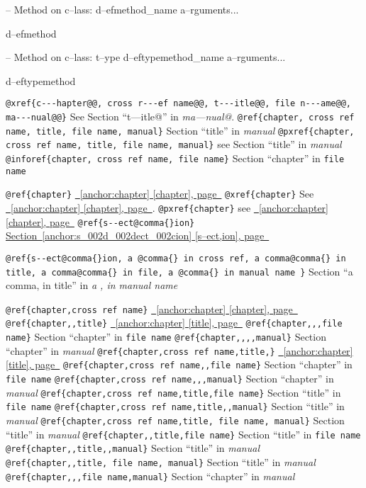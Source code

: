 \documentclass{book}
\begin{document}
\begin{titlepage}
\hbox{}-- Method on c--lass: d--efmethod\_name a--rguments...


%
d--efmethod

\hbox{}-- Method on c--lass: t--ype d--eftypemethod\_name a--rguments...


%
d--eftypemethod

\texttt{@xref\{c{-}{-}{-}hapter@@, cross r{-}{-}{-}ef name@@, t{-}{-}{-}itle@@, file n{-}{-}{-}ame@@, ma{-}{-}{-}nual@@\}} See Section ``t---itle@'' in \textit{ma---nual@}.
\texttt{@ref\{chapter, cross ref name, title, file name, manual\}} Section ``title'' in \textit{manual}
\texttt{@pxref\{chapter, cross ref name, title, file name, manual\}} see Section ``title'' in \textit{manual}
\texttt{@inforef\{chapter, cross ref name, file name\}} Section ``chapter'' in \texttt{file name}

\texttt{@ref\{chapter\}} \hyperref[anchor:chapter]{\chaptername~\ref*{anchor:chapter} [chapter], page~\pageref*{anchor:chapter}}
\texttt{@xref\{chapter\}} See \hyperref[anchor:chapter]{\chaptername~\ref*{anchor:chapter} [chapter], page~\pageref*{anchor:chapter}}.
\texttt{@pxref\{chapter\}} see \hyperref[anchor:chapter]{\chaptername~\ref*{anchor:chapter} [chapter], page~\pageref*{anchor:chapter}}
\texttt{@ref\{s{-}{-}ect@comma\{\}ion\}} \hyperref[anchor:s_002d_002dect_002cion]{Section~\ref*{anchor:s_002d_002dect_002cion} [s--ect,ion], page~\pageref*{anchor:s_002d_002dect_002cion}}

\texttt{@ref\{s{-}{-}ect@comma\{\}ion, a @comma\{\} in cross
ref, a comma@comma\{\} in title, a comma@comma\{\} in file, a @comma\{\} in manual name \}}
Section ``a comma, in title'' in \textit{a , in manual name}

\texttt{@ref\{chapter,cross ref name\}} \hyperref[anchor:chapter]{\chaptername~\ref*{anchor:chapter} [chapter], page~\pageref*{anchor:chapter}}
\texttt{@ref\{chapter,,title\}} \hyperref[anchor:chapter]{\chaptername~\ref*{anchor:chapter} [title], page~\pageref*{anchor:chapter}}
\texttt{@ref\{chapter,,,file name\}} Section ``chapter'' in \texttt{file name}
\texttt{@ref\{chapter,,,,manual\}} Section ``chapter'' in \textit{manual}
\texttt{@ref\{chapter,cross ref name,title,\}} \hyperref[anchor:chapter]{\chaptername~\ref*{anchor:chapter} [title], page~\pageref*{anchor:chapter}}
\texttt{@ref\{chapter,cross ref name,,file name\}} Section ``chapter'' in \texttt{file name}
\texttt{@ref\{chapter,cross ref name,,,manual\}} Section ``chapter'' in \textit{manual}
\texttt{@ref\{chapter,cross ref name,title,file name\}} Section ``title'' in \texttt{file name}
\texttt{@ref\{chapter,cross ref name,title,,manual\}} Section ``title'' in \textit{manual}
\texttt{@ref\{chapter,cross ref name,title, file name, manual\}} Section ``title'' in \textit{manual}
\texttt{@ref\{chapter,,title,file name\}} Section ``title'' in \texttt{file name}
\texttt{@ref\{chapter,,title,,manual\}} Section ``title'' in \textit{manual}
\texttt{@ref\{chapter,,title, file name, manual\}} Section ``title'' in \textit{manual}
\texttt{@ref\{chapter,,,file name,manual\}} Section ``chapter'' in \textit{manual}



\end{titlepage}
\end{document}
